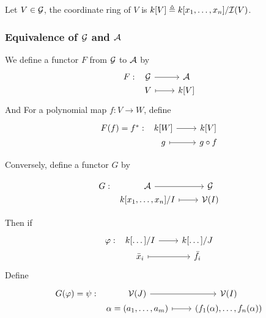 \begin{definition}
  Let $V \in \mathcal{G}$, the coordinate ring of $V$ is $k[V] \triangleq k[x_1, \dots, x_n] / \mathcal{I}(V)$.
\end{definition}

\subsubsection{Equivalence of $\mathcal{G}$ and $\mathcal{A}$}
We define a functor $F$ from $\mathcal{G}$ to $\mathcal{A}$ by
  \[
    \begin{tikzcd}[column sep=0.8cm,row sep=0ex]
      F: &[-0.7cm] \Gc \arrow[r] & \Ac \\
      & V \arrow[r, mapsto] & k[V]
    \end{tikzcd}
  \]
  And For a polynomial map $f : V \to W$, define
  \[
    \begin{tikzcd}[column sep=0.8cm,row sep=0ex]
      F(f) = f^*: &[-0.7cm] k[W] \arrow[r] & k[V] \\
      & g \arrow[r, mapsto] & g \circ f
    \end{tikzcd}
  \]

  Conversely, define a functor $G$ by

  \[
    \begin{tikzcd}[column sep=0.8cm,row sep=0ex]
      G: &[-0.7cm] \Ac \arrow[r] & \Gc \\
      & k[x_1, \dots, x_n]/I \arrow[r, mapsto] & \Vc(I)
    \end{tikzcd}
  \]

  Then if
  \[
    \begin{tikzcd}[column sep=0.8cm,row sep=0ex]
      \varphi: &[-0.7cm] k[\dots]/I \arrow[r] & k[\dots]/J \\
      & \bar{x}_i \arrow[r, mapsto] & \bar{f}_i
    \end{tikzcd}
  \]
  Define
  \[
    \begin{tikzcd}[column sep=0.8cm,row sep=0ex]
      G(\varphi) = \psi: &[-0.7cm] \Vc(J) \arrow[r] & \Vc(I) \\
      & \alpha = (a_1, \dots, a_m) \arrow[r, mapsto] & (f_1(\alpha), \dots, f_n(\alpha))
    \end{tikzcd}
  \]
